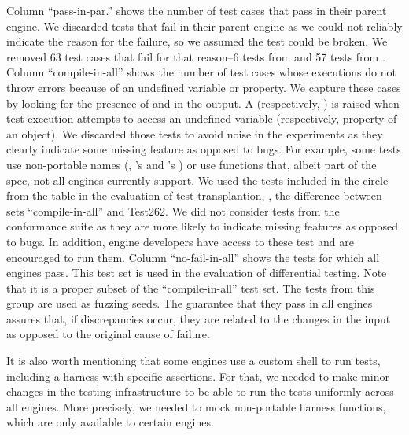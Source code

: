 \documentclass[10pt,conference,anonymous]{IEEEtran}
\begin{document}
Column ``pass-in-par.'' shows the number of test cases that pass in
their parent engine. We discarded tests that fail in their parent
engine as we could not reliably indicate the reason for the failure,
so we assumed the test could be broken. We removed 63 test cases that
fail for that reason--6 tests from \jsc{} and 57 tests from
\smonkey. Column ``compile-in-all'' shows the number of test cases
whose executions do not throw errors because of an undefined variable
or property. We capture these cases by looking for the presence of
 and  in the output. A
 (respectively, ) is raised
when test execution attempts to access an undefined variable
(respectively, property of an object). We discarded those tests to
avoid noise in the experiments as they clearly indicate some missing
feature as opposed to bugs. For example, some tests use non-portable
names (\eg{}, \jsc{}'s  and \smonkey{}'s
) or use functions that, albeit part of the
spec, not all engines currently support. We used the
\totalTestFilesForTestTransplantation{} tests included in the circle
from the table in the evaluation of test transplantion, \ie{}, the
difference between sets ``compile-in-all'' and Test262. We did not
consider tests from the conformance suite as they are more likely to
indicate missing features as opposed to bugs. In addition, engine
developers have access to these test and are encouraged to run
them. Column ``no-fail-in-all'' shows the tests for which all engines
pass. This test set is used in the evaluation of differential
testing. Note that it is a proper subset of the ``compile-in-all''
test set. The tests from this group are used as fuzzing seeds. The
guarantee that they pass in all engines assures that, if discrepancies
occur, they are related to the changes in the input as opposed to the
original cause of failure.

It is also worth mentioning that some engines use a custom shell to
run tests, including a harness with specific assertions.  For that, we
needed to make minor changes in the testing infrastructure to be able
to run the tests uniformly across all engines. More precisely, we
needed to mock non-portable harness functions, which are only
available to certain engines.

\newcommand\marktopleft[1]{%
    \tikz[overlay,remember picture] 
        \node (marker-#1-a) at (0,1.5ex) {};%
}
\newcommand\markbottomright[1]{%
    \tikz[overlay,remember picture] 
        \node (marker-#1-b) at (0,0) {};%
    \tikz[overlay,remember picture,thick,dashed,inner sep=3pt]
        \node[draw,rounded rectangle,fit=(marker-#1-a.center) (marker-#1-b.center)] {};%
}
\end{document}
